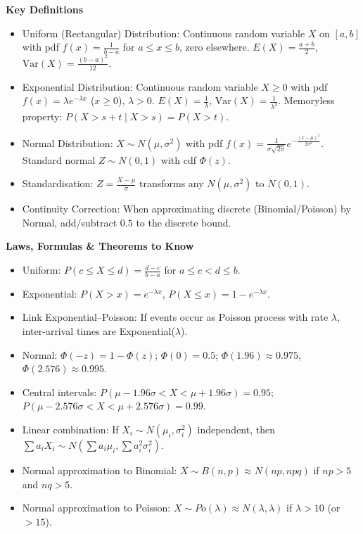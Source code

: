 \documentclass[11pt]{article}
\newcommand{\cle}[1]{{\popxbold\color{popdark}#1}}
\begin{document}
\begin{bilan}
\textbf{Key Definitions}
\begin{itemize}
\item \cle{Uniform (Rectangular) Distribution}: Continuous random variable $X$ on $[a,b]$ with pdf $f(x)=\frac{1}{b-a}$ for $a\le x\le b$, zero elsewhere. $E(X)=\frac{a+b}{2}$, $\mathrm{Var}(X)=\frac{(b-a)^2}{12}$.
\item \cle{Exponential Distribution}: Continuous random variable $X\ge0$ with pdf $f(x)=\lambda e^{-\lambda x}$ ($x\ge0$), $\lambda>0$. $E(X)=\frac{1}{\lambda}$, $\mathrm{Var}(X)=\frac{1}{\lambda^2}$. Memoryless property: $P(X>s+t\mid X>s)=P(X>t)$.
\item \cle{Normal Distribution}: $X\sim N(\mu,\sigma^2)$ with pdf $f(x)=\frac{1}{\sigma\sqrt{2\pi}}e^{-\frac{(x-\mu)^2}{2\sigma^2}}$. Standard normal $Z\sim N(0,1)$ with cdf $\Phi(z)$.
\item \cle{Standardisation}: $Z=\frac{X-\mu}{\sigma}$ transforms any $N(\mu,\sigma^2)$ to $N(0,1)$.
\item \cle{Continuity Correction}: When approximating discrete (Binomial/Poisson) by Normal, add/subtract $0.5$ to the discrete bound.
\end{itemize}

\textbf{Laws, Formulas \& Theorems to Know}
\begin{itemize}
\item Uniform: $P(c\le X\le d)=\frac{d-c}{b-a}$ for $a\le c<d\le b$.
\item Exponential: $P(X>x)=e^{-\lambda x}$, $P(X\le x)=1-e^{-\lambda x}$.
\item Link Exponential–Poisson: If events occur as Poisson process with rate $\lambda$, inter-arrival times are Exponential($\lambda$).
\item Normal: $\Phi(-z)=1-\Phi(z)$; $\Phi(0)=0.5$; $\Phi(1.96)\approx0.975$, $\Phi(2.576)\approx0.995$.
\item Central intervals: $P(\mu-1.96\sigma<X<\mu+1.96\sigma)=0.95$; $P(\mu-2.576\sigma<X<\mu+2.576\sigma)=0.99$.
\item Linear combination: If $X_i\sim N(\mu_i,\sigma_i^2)$ independent, then $\sum a_i X_i \sim N(\sum a_i\mu_i,\sum a_i^2\sigma_i^2)$.
\item Normal approximation to Binomial: $X\sim B(n,p) \approx N(np,npq)$ if $np>5$ and $nq>5$.
\item Normal approximation to Poisson: $X\sim Po(\lambda) \approx N(\lambda,\lambda)$ if $\lambda>10$ (or $>15$).
\end{itemize}


\end{bilan}
\end{document}
